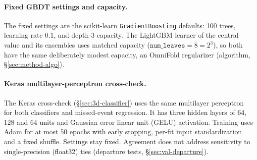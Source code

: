\paragraph{Fixed GBDT settings and capacity.} The fixed settings are the scikit-learn \texttt{GradientBoosting} defaults: 100 trees, learning rate $0.1$, and depth-3 capacity. The LightGBM learner of the central value and its ensembles uses matched capacity ($\texttt{num\_leaves}=8=2^{3}$), so both have the same deliberately modest capacity, an OmniFold regularizer (algorithm, \S\ref{sec:method-algo}).

\paragraph{Keras multilayer-perceptron cross-check.} The Keras cross-check (\S\ref{sec:3d-classifier}) uses the same multilayer perceptron for both classifiers and missed-event regression. It has three hidden layers of 64, 128 and 64 units and Gaussian error linear unit (GELU) activation. Training uses Adam for at most 50 epochs with early stopping, per-fit input standardization and a fixed shuffle. Settings stay fixed. Agreement does not address sensitivity to single-precision (float32) ties (departure tests, \S\ref{sec:val-departure}).

